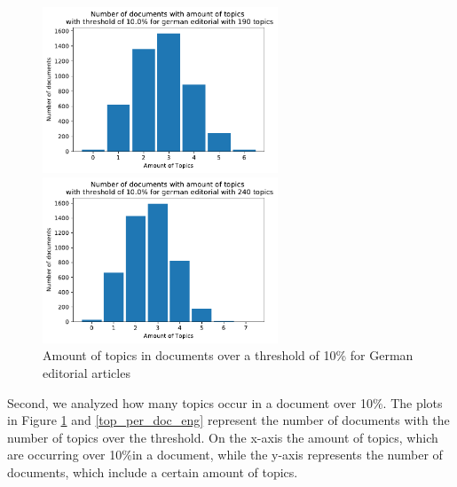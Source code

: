 \begin{figure}
\begin{minipage}[t]{0.5\textwidth}
	\end{minipage}
	\begin{minipage}[t]{0.5\textwidth}
		\includegraphics[width=7cm]{gfx/GrafikenFinal/germaneditoriallda_topPerdoc190.pdf}
	\end{minipage}
	\begin{minipage}[t]{0.5\textwidth}
		\includegraphics[width=7cm]{gfx/GrafikenFinal/germaneditoriallda_topPerdoc240.pdf}
	\end{minipage}
	\caption[]{Amount of topics in documents over a threshold of 10\% for German editorial articles}
	\label{top_per_doc_ger}
\end{figure}

Second, we analyzed how many topics occur in a document over 10\%. 
The plots in Figure \ref{top_per_doc_ger} and \ref{top_per_doc_eng} represent the number of documents with the number of topics over the threshold. On the x-axis the amount of topics, which are occurring over 10\%in a document, while the y-axis represents the number of documents, which include a certain amount of topics. 

